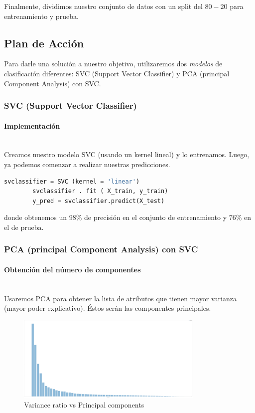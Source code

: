 \documentclass[letterpaper,11pt]{article}
\newcommand{\subsubsubsection}[1]{\paragraph{#1}\mbox{}\\}
\begin{document}
Finalmente, dividimos nuestro conjunto de datos con un split del $80-20$ 
para entrenamiento y prueba. 

\subsection{Plan de Acción}
Para darle una solución a nuestro objetivo, utilizaremos dos \textit{modelos}
de clasificación diferentes: SVC (Support Vector Classifier) y PCA (principal 
Component Analysis) con SVC. 

\subsubsection{SVC (Support Vector Classifier)}
\subsubsubsection{Implementación}
Creamos nuestro modelo SVC (usando un kernel lineal) y lo entrenamos. Luego, 
ya podemos comenzar a realizar nuestras predicciones.

\begin{minipage}[t]{0.7\textwidth}
    \begin{lstlisting}[language = Python]
        svclassifier = SVC (kernel = 'linear')
        svclassifier . fit ( X_train, y_train)
        y_pred = svclassifier.predict(X_test)
    \end{lstlisting}
\end{minipage}

donde obtenemos un $98\%$ de precisión en el conjunto de entrenamiento y 
$76\%$ en el de prueba.

\subsubsection{PCA (principal Component Analysis) con SVC}
\subsubsubsection{Obtención del número de componentes}

Usaremos PCA para obtener la lista de atributos que tienen mayor varianza
(mayor poder explicativo). Éstos serán las componentes principales.

\begin{figure}[h]
    \centering
    \includegraphics[width=0.8\textwidth]{./imagenes/components1.png}
    \caption{Variance ratio vs Principal components}
\end{figure}    
\end{document}
